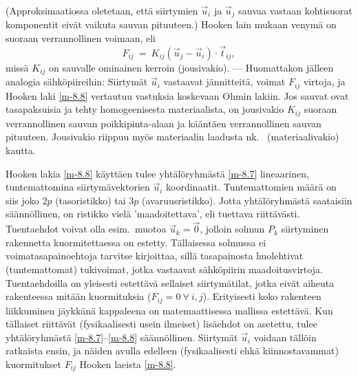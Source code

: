 (Approksimaatiossa oletetaan, että siirtymien $\vec{u}_i$ ja $\vec{u}_j$ sauvaa vastaan 
kohtisuorat komponentit eivät vaikuta sauvan pituuteen.) Hooken lain mukaan venymä on suoraan
verrannollinen voimaan, eli
\begin{equation} \label{m-8.8}
F_{ij}\ =\ K_{ij} (\vec{u}_j - \vec{u}_i) \cdot \vec{t}_{ij},
\end{equation}
missä $K_{ij}$ on sauvalle ominainen kerroin (jousivakio). --- Huomattakon jälleen analogia 
sähköpiireihin: Siirtymät $\vec{u}_i$ vastaavat jännitteitä, voimat $F_{ij}$ virtoja, ja 
Hooken laki \eqref{m-8.8} vertautuu vastuksia koskevaan Ohmin lakiin. Jos sauvat ovat 
tasapaksuisia ja tehty homogeenisesta materiaalista, on jousivakio $K_{ij}$ suoraan 
verrannollinen sauvan poikkipinta-alaan ja kääntäen verrannollinen sauvan pituuteen. Jousivakio
riippuu myös materiaalin laadusta nk.\  (materiaalivakio) kautta. 

Hooken lakia \eqref{m-8.8} käyttäen tulee yhtälöryhmästä \eqref{m-8.7} lineaarinen, 
tuntemattomina siirtymävektorien $\vec{u}_i$ koordinaatit. Tuntemattomien määrä on siis joko 
$2p$ (tasoristikko) tai $3p$ (avaruusristikko). Jotta yhtälöryhmästä saataisiin säännöllinen, on
ristikko vielä 'maadoitettava', eli tuettava riittävästi. Tuentaehdot voivat olla esim.\ muotoa 
$\vec{u}_k = \vec{0}$, jolloin solmun $P_k$ siirtyminen rakennetta kuormitettaessa on estetty.
Tällaisessa solmussa ei voimatasapainoehtoja tarvitse kirjoittaa, sillä tasapainosta huolehtivat
(tuntemattomat) tukivoimat, jotka vastaavat sähköpiirin maadoitusvirtoja. Tuentaehdoilla on 
yleisesti estettävä sellaiset siirtymätilat, jotka eivät aiheuta rakenteessa mitään kuormituksia
($F_{ij} = 0\ \forall\ i,j$). Erityisesti koko rakenteen liikkuminen jäykkänä kappaleena on 
matemaattisessa mallissa estettävä. Kun tällaiset riittävät (fysikaalisesti usein ilmeiset)
lisäehdot on asetettu, tulee yhtälöryhmästä \eqref{m-8.7}--\eqref{m-8.8} säännöllinen.
Siirtymät $\vec{u}_i$ voidaan tällöin ratkaista ensin, ja näiden avulla edelleen 
(fysikaalisesti ehkä kiinnostavammat) kuormitukset $F_{ij}$ Hooken laeista \eqref{m-8.8}.

